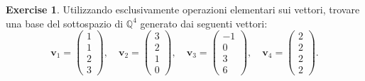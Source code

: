 \documentclass{article}
\theoremstyle{plain}
\theoremstyle{definition}
\newtheorem{xca}[exmp]{Exercise}
\theoremstyle{remark}
\begin{document}
\vspace{10pt}

\begin{bxthm}
\begin{xca}
    Utilizzando esclusivamente operazioni elementari sui vettori, trovare una base del sottospazio di $\mathbb{Q}^4$ generato dai seguenti vettori:
        \[
        \mathbf{v}_1 = \begin{pmatrix} 1 \\ 1 \\ 2 \\ 3 \end{pmatrix},\quad 
        \mathbf{v}_2 = \begin{pmatrix} 3 \\ 2 \\ 1 \\ 0 \end{pmatrix},\quad 
        \mathbf{v}_3 = \begin{pmatrix} -1 \\ 0 \\ 3 \\ 6 \end{pmatrix},\quad 
        \mathbf{v}_4 = \begin{pmatrix} 2 \\ 2 \\ 2 \\ 2 \end{pmatrix}.
        \]
\end{xca}
\end{bxthm}

\vspace{10pt}
\end{document}
